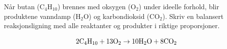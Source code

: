 

Når butan (C$_{4}$H$_{10}$) brennes med oksygen (O$_{2}$) under ideelle forhold, blir produktene vanndamp (H$_{2}$O) og karbondioksid (CO$_{2}$). Skriv en balansert reaksjonsligning med alle reaktanter og produkter i riktige proporsjoner.







$$\hbox{2C}_4\hbox{H}_{10} + \hbox{13O}_2 \to \hbox{10H}_2\hbox{O} + \hbox{8CO}_2$$










